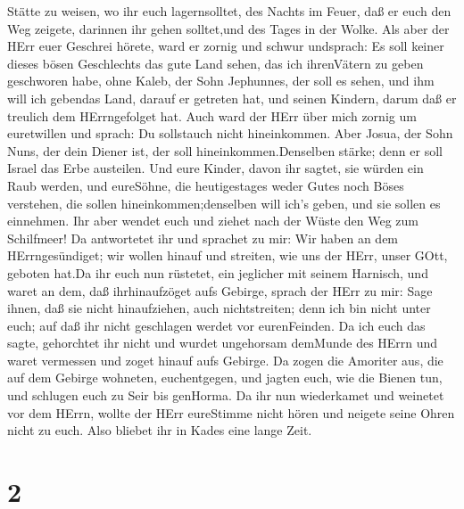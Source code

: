 Stätte zu weisen, wo ihr euch lagernsolltet, des Nachts im Feuer, daß er
euch den Weg zeigete, darinnen ihr gehen solltet,und des Tages in der
Wolke.  Als aber der HErr euer Geschrei hörete, ward er
zornig und schwur undsprach:  Es soll keiner dieses bösen
Geschlechts das gute Land sehen, das ich ihrenVätern zu geben geschworen
habe,  ohne Kaleb, der Sohn Jephunnes, der soll es sehen,
und ihm will ich gebendas Land, darauf er getreten hat, und seinen
Kindern, darum daß er treulich dem HErrngefolget hat.  Auch
ward der HErr über mich zornig um euretwillen und sprach: Du sollstauch
nicht hineinkommen.  Aber Josua, der Sohn Nuns, der dein
Diener ist, der soll hineinkommen.Denselben stärke; denn er soll Israel
das Erbe austeilen.  Und eure Kinder, davon ihr sagtet, sie
würden ein Raub werden, und eureSöhne, die heutigestages weder Gutes
noch Böses verstehen, die sollen hineinkommen;denselben will ich's
geben, und sie sollen es einnehmen.  Ihr aber wendet euch
und ziehet nach der Wüste den Weg zum Schilfmeer!  Da
antwortetet ihr und sprachet zu mir: Wir haben an dem HErrngesündiget;
wir wollen hinauf und streiten, wie uns der HErr, unser GOtt, geboten
hat.Da ihr euch nun rüstetet, ein jeglicher mit seinem Harnisch, und
waret an dem, daß ihrhinaufzöget aufs Gebirge,  sprach der
HErr zu mir: Sage ihnen, daß sie nicht hinaufziehen, auch nichtstreiten;
denn ich bin nicht unter euch; auf daß ihr nicht geschlagen werdet vor
eurenFeinden.  Da ich euch das sagte, gehorchtet ihr nicht
und wurdet ungehorsam demMunde des HErrn und waret vermessen und zoget
hinauf aufs Gebirge.  Da zogen die Amoriter aus, die auf
dem Gebirge wohneten, euchentgegen, und jagten euch, wie die Bienen tun,
und schlugen euch zu Seir bis genHorma.  Da ihr nun
wiederkamet und weinetet vor dem HErrn, wollte der HErr eureStimme nicht
hören und neigete seine Ohren nicht zu euch.  Also bliebet
ihr in Kades eine lange Zeit.

\hypertarget{section-1}{%
\section{2}\label{section-1}}

